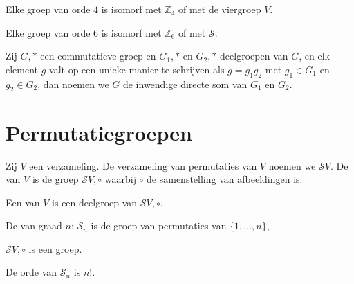 \documentclass[main.tex]{subfiles}
\begin{document}
\begin{ei}
  \label{ei:groep-orde-vier}
  Elke groep van orde $4$ is isomorf met $\mathbb{Z}_{4}$ of met de viergroep $V$.

\end{ei}

\begin{ei}
  \label{ei-groep-orde-zes}
  Elke groep van orde $6$ is isomorf met $\mathbb{Z}_{6}$ of met $\mathcal{S}$. 

\end{ei}

\begin{de}
  Zij $G,*$ een commutatieve groep en $G_{1},*$ en $G_{2},*$ deelgroepen van $G$, en elk element $g$ valt op een unieke manier te schrijven als $g=g_{1}g_{2}$ met $g_{1}\in G_{1}$ en $g_{2}\in G_{2}$, dan noemen we $G$ de inwendige directe som van $G_{1}$ en $G_{2}$.
\end{de}

\section{Permutatiegroepen}
\label{sec:permutatiegroepen}

\begin{de}
  Zij $V$ een verzameling.
  De verzameling van permutaties van $V$ noemen we $\mathcal{S}V$.
  De  van $V$ is de groep $\mathcal{S}V, \circ$ waarbij $\circ$ de samenstelling van afbeeldingen is.
\end{de}

\begin{de}
  Een  van $V$ is een deelgroep van $\mathcal{S}V,\circ$.
\end{de}

\begin{de}
  De  van graad $n$: $\mathcal{S}_{n}$ is de groep van permutaties van $\{1,\dotsc,n\}$,
\end{de}

\begin{st}
  $\mathcal{S}V,\circ$ is een groep.

\end{st}

\begin{st}
  De orde van $\mathcal{S}_{n}$ is $n!$.

\end{st}
\end{document}
